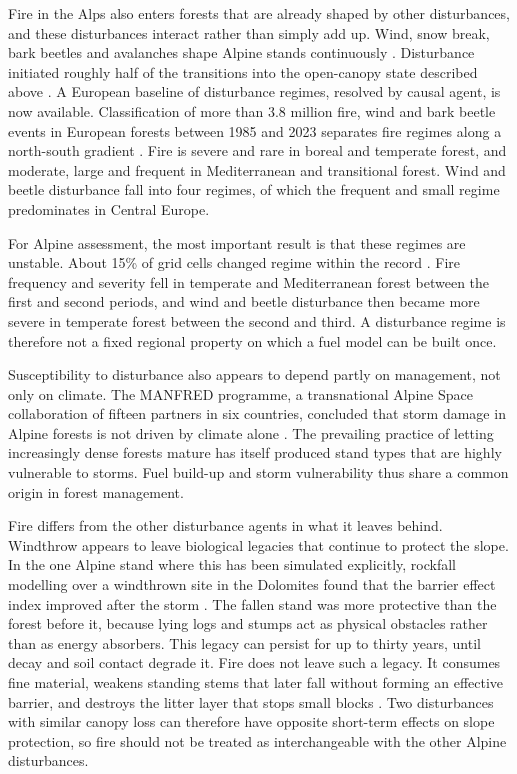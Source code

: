 \documentclass[11pt,a4paper]{article}
\begin{document}
Fire in the Alps also enters forests that are already shaped by other disturbances, and these disturbances interact rather than simply add up. Wind, snow break, bark beetles and avalanches shape Alpine stands continuously \citep{bebi_changes_2017}. Disturbance initiated roughly half of the transitions into the open-canopy state described above \citep{stritih_alternative_2023}. A European baseline of disturbance regimes, resolved by causal agent, is now available. Classification of more than 3.8 million fire, wind and bark beetle events in European forests between 1985 and 2023 separates fire regimes along a north-south gradient \citep{miguel_unravelling_2026}. Fire is severe and rare in boreal and temperate forest, and moderate, large and frequent in Mediterranean and transitional forest. Wind and beetle disturbance fall into four regimes, of which the frequent and small regime predominates in Central Europe.

For Alpine assessment, the most important result is that these regimes are unstable. About 15\% of grid cells changed regime within the record \citep{miguel_unravelling_2026}. Fire frequency and severity fell in temperate and Mediterranean forest between the first and second periods, and wind and beetle disturbance then became more severe in temperate forest between the second and third. A disturbance regime is therefore not a fixed regional property on which a fuel model can be built once.

Susceptibility to disturbance also appears to depend partly on management, not only on climate. The MANFRED programme, a transnational Alpine Space collaboration of fifteen partners in six countries, concluded that storm damage in Alpine forests is not driven by climate alone \citep{jandl_management_2013}. The prevailing practice of letting increasingly dense forests mature has itself produced stand types that are highly vulnerable to storms. Fuel build-up and storm vulnerability thus share a common origin in forest management.

Fire differs from the other disturbance agents in what it leaves behind. Windthrow appears to leave biological legacies that continue to protect the slope. In the one Alpine stand where this has been simulated explicitly, rockfall modelling over a windthrown site in the Dolomites found that the barrier effect index improved after the storm \citep{costa_biological_2021}. The fallen stand was more protective than the forest before it, because lying logs and stumps act as physical obstacles rather than as energy absorbers. This legacy can persist for up to thirty years, until decay and soil contact degrade it. Fire does not leave such a legacy. It consumes fine material, weakens standing stems that later fall without forming an effective barrier, and destroys the litter layer that stops small blocks \citep{asteriou_assessing_2025}. Two disturbances with similar canopy loss can therefore have opposite short-term effects on slope protection, so fire should not be treated as interchangeable with the other Alpine disturbances.
\end{document}
